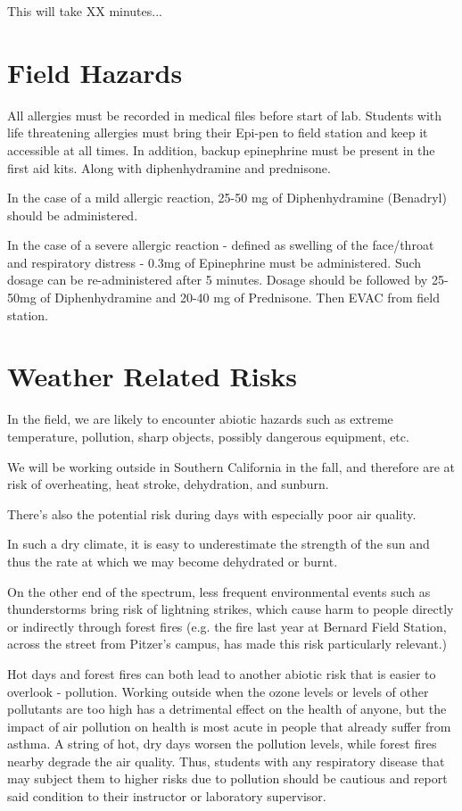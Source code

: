 \documentclass[12pt]{../SOP2}
\begin{document}
\NP This will take XX minutes...

\section{Field Hazards}

\NP All allergies must be recorded in medical files before start of lab. Students with life threatening allergies must bring their Epi-pen to field station and keep it accessible at all times. In addition, backup epinephrine must be present in the first aid kits. Along with diphenhydramine and prednisone. 

\NP In the case of a mild allergic reaction, 25-50 mg of Diphenhydramine (Benadryl) should be administered. 

\NP In the case of a severe allergic reaction - defined as swelling of the face/throat and respiratory distress - 0.3mg of Epinephrine must be administered. Such dosage can be re-administered after 5 minutes. Dosage should be followed by 25-50mg of Diphenhydramine and 20-40 mg of Prednisone. Then EVAC from field station. 

\section{Weather Related Risks}

\NP In the field, we are likely to encounter abiotic hazards such as extreme temperature, pollution, sharp objects, possibly dangerous equipment, etc. 

\NP We will be working outside in Southern California in the fall, and therefore are at risk of overheating, heat stroke, dehydration, and sunburn. 

\NP There's also the potential risk during days with especially poor air quality. 

\NP In such a dry climate, it is easy to underestimate the strength of the sun and thus the rate at which we may become dehydrated or burnt.  

\NP On the other end of the spectrum, less frequent environmental events such as thunderstorms bring risk of lightning strikes, which cause harm to people directly or indirectly through forest fires (e.g. the fire last year at Bernard Field Station, across the street from Pitzer's campus, has made this risk particularly relevant.)

\NP Hot days and forest fires can both lead to another abiotic risk that is easier to overlook - pollution. Working outside when the ozone levels or levels of other pollutants are too high has a detrimental effect on the health of anyone, but the impact of air pollution on health is most acute in people that already suffer from asthma. A string of hot, dry days worsen the pollution levels, while forest fires nearby degrade the air quality. Thus, students with any respiratory disease that may subject them to higher risks due to pollution should be cautious and report said condition to their instructor or laboratory supervisor. 
\end{document}
